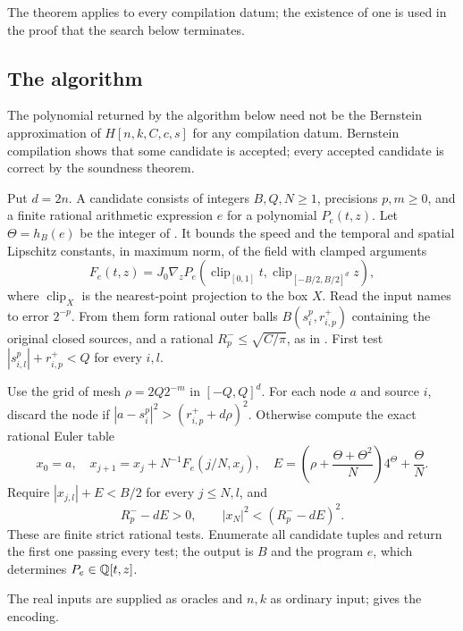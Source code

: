 The theorem applies to every compilation datum; the existence of one is used in the proof that the search
below terminates.

\subsection{The algorithm}\label{sec:eff-algorithm}

\begin{remark}\label{rem:eff-certified}
The polynomial returned by the algorithm below need not be the Bernstein approximation of
$H[n,k,C,c,s]$ for any compilation datum. Bernstein compilation shows that some candidate is
accepted; every accepted candidate is correct by the soundness theorem.
\end{remark}

Put $d=2n$. A candidate consists of integers $B,Q,N\ge1$, precisions $p,m\ge0$,
and a finite rational arithmetic expression $e$ for a polynomial $P_e(t,z)$.
Let $\Theta=h_B(e)$ be the integer of .
It bounds the speed and the temporal and spatial Lipschitz constants, in maximum
norm, of the field with clamped arguments
\[
 F_e(t,z)=J_0\nabla_zP_e(\operatorname{clip}_{[0,1]}t,
                  \operatorname{clip}_{[-B/2,B/2]^d}z),
\]
where $\operatorname{clip}_X$ is the nearest-point projection to the box $X$.
Read the input names to error $2^{-p}$. From them form rational outer balls
$B(s_i^p,r^+_{i,p})$ containing the original closed sources, and a rational
$R^-_p\le\sqrt{C/\pi}$, as in .
First test $|s^p_{i,l}|+r^+_{i,p}<Q$ for every $i,l$.

Use the grid of mesh $\rho=2Q2^{-m}$ in $[-Q,Q]^d$. For each node $a$ and source
$i$, discard the node if $|a-s_i^p|^2>(r^+_{i,p}+d\rho)^2$.
Otherwise compute the exact rational Euler table
\[
 x_0=a,\quad x_{j+1}=x_j+N^{-1}F_e(j/N,x_j),\quad
 E=\left(\rho+\frac{\Theta+\Theta^2}{N}\right)4^\Theta+\frac{\Theta}{N}.
\]
Require $|x_{j,l}|+E<B/2$ for every $j\le N,l$, and
\[
 R^-_p-dE>0,\qquad |x_N|^2<(R^-_p-dE)^2.
\]
These are finite strict rational tests. Enumerate all candidate tuples and return
the first one passing every test; the output is $B$ and the program $e$, which determines $P_e\in\mathbb{Q}[t,z]$.

The real inputs are supplied as oracles and $n,k$ as ordinary input;  gives the encoding.

